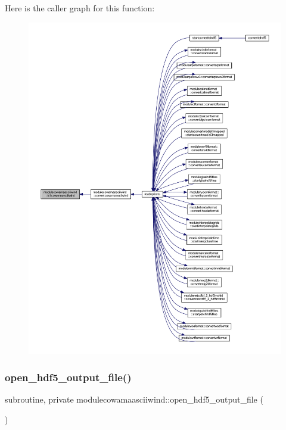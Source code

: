 Here is the caller graph for this function\+:\nopagebreak
\begin{figure}[H]
\begin{center}
\leavevmode
\includegraphics[width=350pt]{namespacemodulecowamaasciiwind_a23a57a057fbbc4351c19799391d3736b_icgraph}
\end{center}
\end{figure}
\mbox{\label{namespacemodulecowamaasciiwind_aea5f2ecc6c72b859765645c42c117f81}} 
\subsubsection{\texorpdfstring{open\+\_\+hdf5\+\_\+output\+\_\+file()}{open\_hdf5\_output\_file()}}
{\footnotesize\ttfamily subroutine, private modulecowamaasciiwind\+::open\+\_\+hdf5\+\_\+output\+\_\+file (\begin{DoxyParamCaption}{ }\end{DoxyParamCaption})\hspace{0.3cm}{\ttfamily [private]}}

